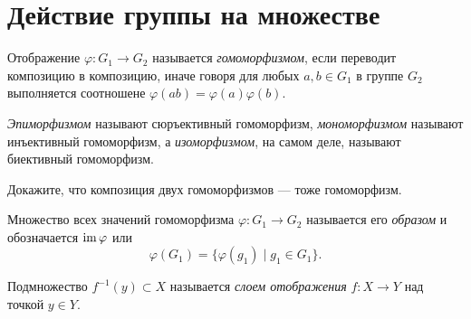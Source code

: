 \section{Действие группы на множестве}
\begin{definition}
    Отображение $\varphi\colon G_1 \to G_2$ называется \emph{гомоморфизмом}, если переводит композицию в композицию, иначе говоря для любых $a,b \in G_1$ в группе $G_2$ выполняется соотношене \(\varphi(ab) = \varphi(a)\varphi(b)\).

    \emph{Эпиморфизмом} называют сюръективный гомоморфизм, \emph{мономорфизмом} называют инъективный гомоморфизм, а \emph{изоморфизмом}, на самом деле, называют биективный гомоморфизм.
\end{definition}

\begin{practice}
    Докажите, что композиция двух гомоморфизмов --- тоже гомоморфизм.
\end{practice}

\begin{definition}
    Множество всех значений гомоморфизма $\varphi \colon G_1 \to G_2$ называется его \emph{образом} и обозначается $\operatorname{im} \varphi$ или $$\varphi (G_1) = \{\varphi(g_1)\mid g_1 \in G_1\}.$$
\end{definition}

\begin{definition}
    Подмножество $f^{-1}(y) \subset X$ называется \emph{слоем отображения} $f \colon X \to Y$ над точкой $y \in Y$.
\end{definition}

